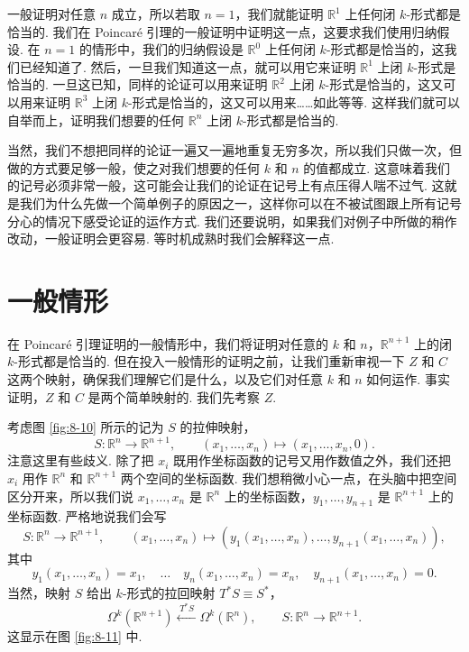 一般证明对任意 $n$ 成立，所以若取 $n=1$，我们就能证明 $\mathbb{R}^1$ 上任何闭 $k$-形式都是恰当的. 我们在 Poincaré 引理的一般证明中证明这一点，这要求我们使用归纳假设. 在 $n=1$ 的情形中，我们的归纳假设是 $\mathbb{R}^0$ 上任何闭 $k$-形式都是恰当的，这我们已经知道了. 然后，一旦我们知道这一点，就可以用它来证明 $\mathbb{R}^1$ 上闭 $k$-形式是恰当的. 一旦这已知，同样的论证可以用来证明 $\mathbb{R}^2$ 上闭 $k$-形式是恰当的，这又可以用来证明 $\mathbb{R}^3$ 上闭 $k$-形式是恰当的，这又可以用来……如此等等. 这样我们就可以自举而上，证明我们想要的任何 $\mathbb{R}^n$ 上闭 $k$-形式都是恰当的.

当然，我们不想把同样的论证一遍又一遍地重复无穷多次，所以我们只做一次，但做的方式要足够一般，使之对我们想要的任何 $k$ 和 $n$ 的值都成立. 这意味着我们的记号必须非常一般，这可能会让我们的论证在记号上有点压得人喘不过气. 这就是我们为什么先做一个简单例子的原因之一，这样你可以在不被试图跟上所有记号分心的情况下感受论证的运作方式. 我们还要说明，如果我们对例子中所做的稍作改动，一般证明会更容易. 等时机成熟时我们会解释这一点.

\section{一般情形}

在 Poincaré 引理证明的一般情形中，我们将证明对任意的 $k$ 和 $n$，$\mathbb{R}^{n+1}$ 上的闭 $k$-形式都是恰当的. 但在投入一般情形的证明之前，让我们重新审视一下 $Z$ 和 $C$ 这两个映射，确保我们理解它们是什么，以及它们对任意 $k$ 和 $n$ 如何运作. 事实证明，$Z$ 和 $C$ 是两个简单映射的. 我们先考察 $Z$.

考虑图 \ref{fig:8-10} 所示的记为 $S$ 的拉伸映射，
\[
S:\mathbb{R}^n\to\mathbb{R}^{n+1},\qquad (x_1,\ldots,x_n)\longmapsto(x_1,\ldots,x_n,0).
\]
注意这里有些歧义. 除了把 $x_i$ 既用作坐标函数的记号又用作数值之外，我们还把 $x_i$ 用作 $\mathbb{R}^n$ 和 $\mathbb{R}^{n+1}$ 两个空间的坐标函数. 我们想稍微小心一点，在头脑中把空间区分开来，所以我们说 $x_1,\ldots,x_n$ 是 $\mathbb{R}^n$ 上的坐标函数，$y_1,\ldots,y_{n+1}$ 是 $\mathbb{R}^{n+1}$ 上的坐标函数. 严格地说我们会写
\[
S:\mathbb{R}^n\to\mathbb{R}^{n+1},\qquad
(x_1,\ldots,x_n)\longmapsto\left(y_1(x_1,\ldots,x_n),\ldots,y_{n+1}(x_1,\ldots,x_n)\right),
\]
其中
\[
y_1(x_1,\ldots,x_n)=x_1,\quad\ldots\quad
y_n(x_1,\ldots,x_n)=x_n,\quad
y_{n+1}(x_1,\ldots,x_n)=0.
\]
当然，映射 $S$ 给出 $k$-形式的拉回映射 $T^*S\equiv S^*$，
\[
\Omega^k(\mathbb{R}^{n+1})\xleftarrow{\;T^*S\;}\Omega^k(\mathbb{R}^n),\qquad
S:\mathbb{R}^n\to\mathbb{R}^{n+1}.
\]
这显示在图 \ref{fig:8-11} 中.

